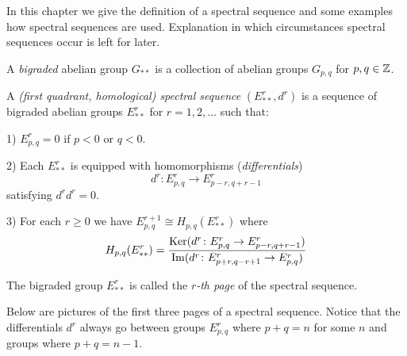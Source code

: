 In this chapter we give the definition of
a spectral sequence and some examples how spectral sequences are used. 
Explanation in which circumstances spectral sequences occur 
is left for later.

\begin{definition}
A \emph{bigraded} abelian group $G_{\ast\ast}$ is a collection of abelian groups
$G_{p, q}$ for $p, q\in {\mathbb Z}$.  
\end{definition}

\begin{definition}
A \emph{(first quadrant, homological) spectral sequence} $(E^{r}_{\ast\ast}, d^{r})$ 
is a sequence of bigraded abelian groups 
$E_{\ast\ast}^{r}$ for $r = 1, 2, \dots$ such that:
\benu
\item[1)] $E^{r}_{p, q} = 0$ if $p< 0$ or $q < 0$.
\item[2)] Each $E_{\ast\ast}^{r}$ is equipped with homomorphisms (\emph{differentials})
\[
d^{r}\colon E^{r}_{p, q} \to E^{r}_{p-r, q+r-1}
\]
satisfying $d^{r}d^{r} = 0$.
\item[3)] For each $r\geq 0$ we have $E^{r+1}_{p, q} \cong H_{p, q}(E^{r}_{\ast\ast})$
where 
\[
H_{p, q}(E^{r}_{\ast\ast})
= \frac{\operatorname{Ker}(d^{r}\colon E^{r}_{p, q} \to E^{r}_{p-r, q+r-1})}
{\operatorname{Im}(d^{r}\colon E^{r}_{p+r, q-r+1} \to E^{r}_{p, q})}
\]
\eenu
\end{definition}

\begin{note}
The bigraded group $E^{r}_{\ast\ast}$ is called the \emph{$r$-th page} of the spectral sequence.
\end{note}

Below are pictures of the first three pages of a spectral sequence. 
Notice that the differentials $d^{r}$ always go between  groups 
$E^{r}_{p, q}$ where $p+q = n$ for some $n$ and groups where $p+q=n-1$. 

